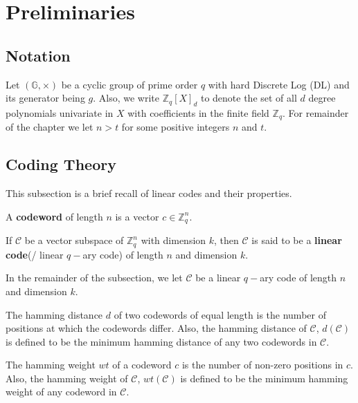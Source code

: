 \chapter{Preliminaries}
\label{chap:preliminaries}

\section{Notation}
Let $(\mathbb{G},\times)$ be a cyclic group of prime order $q$ with hard Discrete Log (DL) and its generator 
being $g$. 
Also, we write $\mathbb{Z}_{q}[X]_d$ to denote the set of all $d$ degree 
polynomials univariate in $X$ with coefficients in the finite field $\mathbb{Z}_q$. For remainder of the 
chapter we let $n>t$ for some positive integers $n$ and $t$.

\section{Coding Theory}
\label{sec:linear-codes}
This subsection is a brief recall of linear codes and their properties.

\begin{definition}[Codeword]
  A \textbf{codeword} of length $n$ is a vector $c\in \mathbb{Z}_q^n$.
\end{definition}

\begin{definition}\cite{gallian2024contemporary}
  If $\mathcal{C}$ be a vector subspace of $\mathbb{Z}_q^n$ with dimension $k$, then $\mathcal{C}$ is 
  said to be a \textbf{linear code}(/ linear $q-$ary code) of length $n$ and dimension $k$.
\end{definition}

In the remainder of the subsection, we let $\mathcal{C}$ be a linear $q-$ary code of length $n$ and 
dimension $k$.

\begin{definition}
  The hamming distance $d$ of two codewords of equal length is the number of positions at which the 
  codewords differ. Also, the hamming distance of $\mathcal{C}$, $d(\mathcal{C})$ is defined to be the 
  minimum hamming distance of any two codewords in $\mathcal{C}$.
\end{definition}

\begin{definition}
  The hamming weight $wt$ of a codeword $c$ is the number of non-zero positions in $c$. Also, the hamming weight of
  $\mathcal{C}$, $wt(\mathcal{C})$ is defined to be the minimum hamming weight of any codeword in $\mathcal{C}$.
\end{definition}

